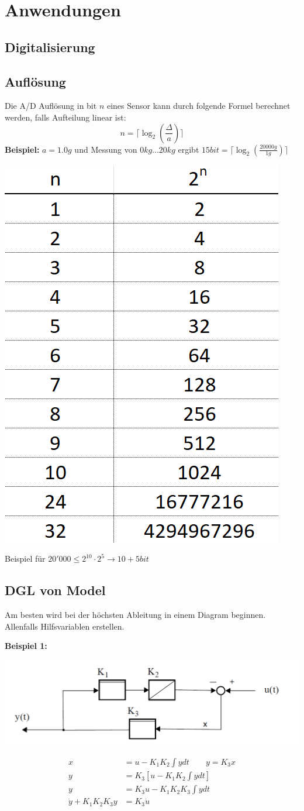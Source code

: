 \section{Anwendungen}
\subsection{Digitalisierung}
\subsection{Auflösung}
Die A/D Auflösung in bit $n$ eines Sensor kann durch folgende Formel berechnet werden, falls Aufteilung linear ist:
\[
n = \lceil \log_2\left(\frac{\Delta}{a}\right) \rceil
\]
\textbf{Beispiel:}
$a = 1.0g$ und Messung von $0kg...20kg$ ergibt $15bit = \lceil \log_2\left(\frac{20000g}{1g}\right) \rceil$

\begin{center}
	\includegraphics[width=0.4\columnwidth]{Images/zweierpotenz}
\end{center}
\noindent Beispiel für $20'000 \leq 2^{10}\cdot2^5 \xrightarrow{} 10 + 5bit$

\subsection{DGL von Model}
Am besten wird bei der höchsten Ableitung in einem Diagram beginnen. Allenfalls Hilfsvariablen erstellen.

\noindent\textbf{Beispiel 1:}
\begin{center}
	\includegraphics[width=0.8\columnwidth]{Images/dgl_bestimmen}
\end{center}
\begin{align*}
	x &= u - K_1K_2\int y dt \qquad y = K_3x \\
	y &= K_3\left[u - K_1K_2\int y dt\right] \\
	y &= K_3u - K_1K_2K_3\int y dt \\ 
	\dot{y} + K_1K_2K_3 y &= K_3 \dot{u}
\end{align*}

